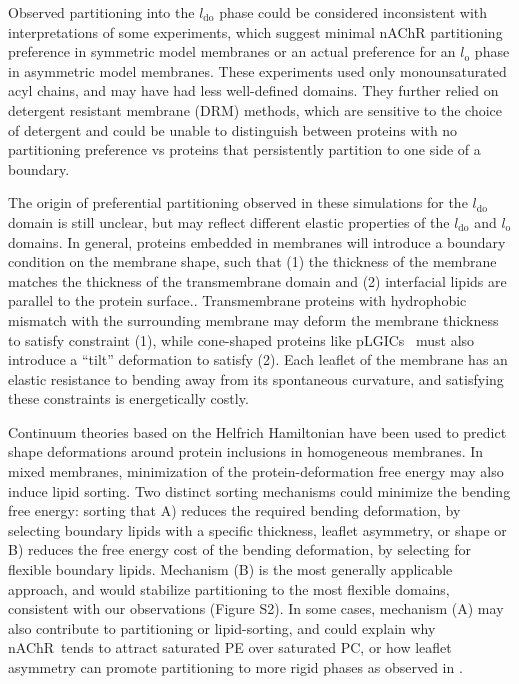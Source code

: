 \documentclass[final,3p,times,twocolumn]{elsarticle}
\newcommand{\lo}{l_{\mathrm{o}}}
\newcommand{\ldo}{l_{\mathrm{do}}}
\newcommand{\nachr}{nAChR}
\begin{document}
Observed partitioning into the $\ldo$ phase could be considered inconsistent with interpretations of some experiments, \cite{Bermdez_Partition_2010,Perillo_Transbilayer_2016}	which suggest minimal nAChR partitioning preference in symmetric model membranes or an actual preference for an $\lo$ phase in asymmetric model membranes.  These experiments used only monounsaturated acyl chains, and may have had less well-defined domains.  They further relied on detergent resistant membrane (DRM) methods, which are sensitive to {the} choice of detergent \cite{Brown2007} and could be unable to distinguish between proteins with no partitioning preference vs proteins that persistently partition to one side of a boundary. 

The origin of preferential partitioning observed in these simulations for the $\ldo$ domain is still unclear, but may reflect different elastic properties of the $\ldo$ and $\lo$ domains.  In general, proteins embedded in membranes will introduce a boundary condition on the membrane shape, such that (1) the thickness of the membrane matches the thickness of the transmembrane domain\cite{Aranda-Espinoza1996, Jensen2004, Brannigan2006} and (2) interfacial lipids are parallel to the protein surface.\cite{goulian1993}.  Transmembrane proteins with hydrophobic mismatch with the surrounding membrane may deform the membrane thickness to satisfy constraint (1), while cone-shaped proteins like pLGICs~ must also introduce a ``tilt'' deformation to satisfy (2).  Each leaflet of the membrane has an elastic resistance to bending away from its spontaneous curvature, and satisfying these constraints is energetically costly.  

Continuum theories based on the Helfrich Hamiltonian have been used to predict shape deformations around protein inclusions in homogeneous membranes.\cite{goulian1993,Aranda-Espinoza1996,Brannigan2006}  In mixed membranes, minimization of the protein-deformation free energy may also induce lipid sorting.  Two distinct sorting mechanisms could minimize the bending free energy: sorting that A) reduces the required bending deformation, by selecting boundary lipids with a specific thickness, leaflet asymmetry, or shape or B) reduces the free energy cost of the bending deformation, by selecting for flexible boundary lipids.   Mechanism (B) is the most generally applicable approach, and would stabilize partitioning to the most flexible domains, consistent with our observations (Figure S2).  In some cases, mechanism (A) may also contribute to partitioning or lipid-sorting, and could explain why \nachr~tends to attract saturated PE over saturated PC, or how leaflet asymmetry can promote partitioning to more rigid phases as observed in \cite{Perillo_Transbilayer_2016} . 
\end{document}
